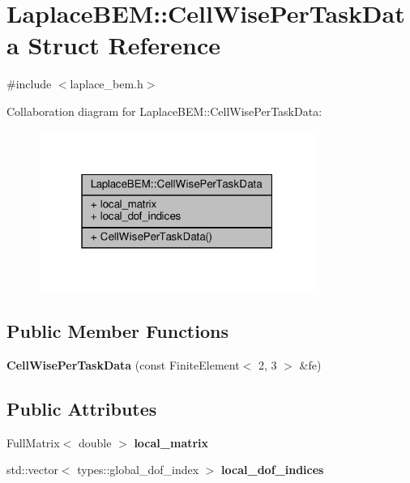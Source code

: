 \hypertarget{structLaplaceBEM_1_1CellWisePerTaskData}{}\section{Laplace\+B\+EM\+:\+:Cell\+Wise\+Per\+Task\+Data Struct Reference}
\label{structLaplaceBEM_1_1CellWisePerTaskData}


{\ttfamily \#include $<$laplace\+\_\+bem.\+h$>$}



Collaboration diagram for Laplace\+B\+EM\+:\+:Cell\+Wise\+Per\+Task\+Data\+:\nopagebreak
\begin{figure}[H]
\begin{center}
\leavevmode
\includegraphics[width=256pt]{structLaplaceBEM_1_1CellWisePerTaskData__coll__graph}
\end{center}
\end{figure}
\subsection*{Public Member Functions}
\begin{DoxyCompactItemize}
\item 
\mbox{\label{structLaplaceBEM_1_1CellWisePerTaskData_aa0a2b02ed445e552f28796e19172512f}} 
{\bfseries Cell\+Wise\+Per\+Task\+Data} (const Finite\+Element$<$ 2, 3 $>$ \&fe)
\end{DoxyCompactItemize}
\subsection*{Public Attributes}
\begin{DoxyCompactItemize}
\item 
\mbox{\label{structLaplaceBEM_1_1CellWisePerTaskData_a20e59a8c53ea438aa2f9781f3fdd3c37}} 
Full\+Matrix$<$ double $>$ {\bfseries local\+\_\+matrix}
\item 
\mbox{\label{structLaplaceBEM_1_1CellWisePerTaskData_a1b32f3d5de8e14dabb6e758311c69a9d}} 
std\+::vector$<$ types\+::global\+\_\+dof\+\_\+index $>$ {\bfseries local\+\_\+dof\+\_\+indices}
\end{DoxyCompactItemize}


